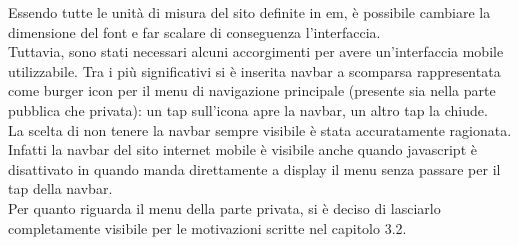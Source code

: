Essendo tutte le unità di misura del sito definite in em, è possibile cambiare la dimensione del font e far scalare di conseguenza l’interfaccia.\\
Tuttavia, sono stati necessari alcuni accorgimenti per avere un’interfaccia mobile utilizzabile.
Tra i più significativi si è inserita navbar a scomparsa rappresentata come burger icon per il menu di navigazione principale
(presente sia nella parte pubblica che privata): un tap sull'icona apre la navbar, un altro tap la chiude.\\
La scelta di non tenere la navbar sempre visibile è stata accuratamente ragionata.
Infatti la navbar del sito internet mobile è visibile anche quando javascript è disattivato in quando manda direttamente a display il menu
senza passare per il tap della navbar.\\
Per quanto riguarda il menu della parte privata, si è deciso di lasciarlo completamente visibile per le motivazioni scritte nel capitolo 3.2.
